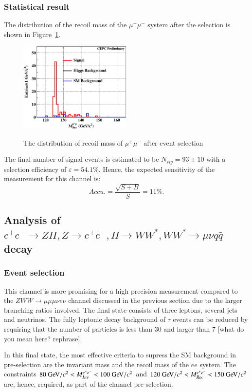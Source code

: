 \documentclass[11pt,a4paper]{cepcnote}
\begin{document}
\subsubsection{Statistical result}
The distribution of the recoil mass of the $\mu^+\mu^-$ system after 
the selection is shown in Figure~\ref{fig:uuhevuvrecfit}.
\begin{figure}[H]
\centering
\includegraphics[width=0.5\textwidth]{e2e2H/evuv/uuh_recfit}
\label{fig:uuhevuvrecfit}
\caption[]{The distribution of recoil mass of $\mu^+\mu^-$ after event selection}
\end{figure}

The final number of signal events is estimated to be $N_{sig} = 93\pm10$ 
with a selection efficiency of $\varepsilon = 54.1\%$. 
Hence, the expected sensitivity of the measurement for this channel is:
\begin{equation*}
Accu.=\frac{\sqrt{S+B}}{S} = 11\%.
\end{equation*}

\subsection{Analysis of $e^+e^-\rightarrow ZH, Z\rightarrow e^+e^-, H\rightarrow WW^*, WW^*\rightarrow \mu\nu q\bar{q}$ decay}
\subsubsection{Event selection}
This channel is more promising for a high precision measurement compared to
the $ZWW\to \mu\mu\mu\nu  e\nu$ channel  discussed in the previous section
due to the larger branching ratios involved.
The final state consists of three leptons, several jets and neutrinos.
The fully leptonic decay background of $\tau$ events can be reduced
by requiring that the number of particles is less than 30 and larger than 7
{\color{red} [what do you mean here? rephrase]}. 

In this final state, the most effective criteria to supress the
SM background in  pre-selection are the invariant mass and the recoil mass 
of the $ee$ system. The constraints $80\gev/c^2 < M_{Inv}^{e^+e^-} < 100\gev/c^2$
and $120\gev/c^2 < M_{Rec}^{e^+e^-} < 150\gev/c^2$ are, hence, required, as part
of the channel pre-selection.
\end{document}
